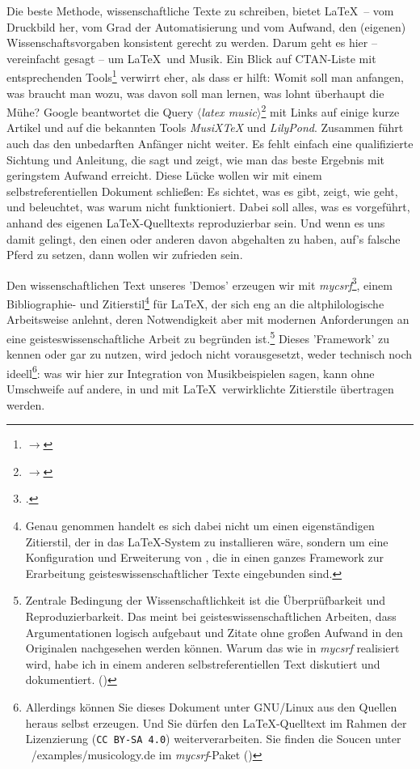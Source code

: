 Die beste Methode, wissenschaftliche Texte zu schreiben, bietet \LaTeX\ -- vom
Druckbild her, vom Grad der Automatisierung und vom Aufwand, den (ei\-ge\-nen)
Wissenschaftsvorgaben konsistent gerecht zu werden. Darum geht es hier --
vereinfacht gesagt -- um \LaTeX\ und Musik. Ein Blick auf CTAN-Liste mit
entsprechenden Tools\footnote{$\rightarrow$
} verwirrt eher, als dass er
hilft: Womit soll man anfangen, was braucht man wozu, was davon soll man lernen,
was lohnt überhaupt die Mühe? Google beantwortet die Query
$\langle$\textit{latex music}$\rangle$\footnote{$\rightarrow$
} mit Links auf einige kurze
Artikel und auf die bekannten Tools \textit{MusiX\TeX} und \textit{LilyPond}.
Zusammen führt auch das den unbedarften Anfänger nicht weiter. Es fehlt einfach
eine qualifizierte Sichtung und Anleitung, die sagt und zeigt, wie man das beste
Ergebnis mit geringstem Aufwand erreicht. Diese Lücke wollen wir mit einem
selbstreferentiellen Dokument schließen: Es sichtet, was es gibt, zeigt, wie
geht, und beleuchtet, was warum nicht funktioniert. Dabei soll alles, was es
vorgeführt, anhand des eigenen \LaTeX-Quelltexts reproduzierbar sein. Und wenn
es uns damit gelingt, den einen oder anderen davon abgehalten zu haben, auf's
falsche Pferd zu setzen, dann wollen wir zufrieden sein.

Den wissenschaftlichen Text unseres 'Demos' erzeugen wir mit
\textit{mycsrf}\footcite[vgl.][\nopage wp]{Reincke2018a}, einem Bibliographie-
und Zitierstil\footnote{Genau genommen handelt es sich dabei nicht um einen
eigenständigen Zitierstil, der in das \LaTeX-System zu installieren wäre,
sondern um eine Konfiguration und Erweiterung von , die in einen
ganzes Framework zur Erarbeitung geisteswissenschaftlicher Texte eingebunden
sind.} für \LaTeX, der sich eng an die altphilologische Arbeitsweise anlehnt,
deren Notwendigkeit aber mit modernen Anforderungen an eine
geisteswissenschaftliche Arbeit zu begründen ist.\footnote{Zentrale Bedingung
der Wissenschaftlichkeit ist die Überprüfbarkeit und Reproduzierbarkeit. Das
meint bei geisteswissenschaftlichen Arbeiten, dass Argumentationen logisch
aufgebaut und Zitate ohne großen Aufwand in den Originalen nachgesehen werden
können. Warum das wie in \textit{mycsrf} realisiert wird, habe ich in einem
anderen selbstreferentiellen Text diskutiert und dokumentiert. (\cite[Vgl.
dazu][1ff]{Reincke2018b})} Dieses 'Framework' zu kennen oder gar zu nutzen, wird
jedoch nicht vorausgesetzt, weder technisch noch ideell\footnote{Allerdings
können Sie dieses Dokument unter GNU/Linux aus den Quellen heraus selbst
erzeugen. Und Sie dürfen den \LaTeX-Quelltext im Rahmen der Lizenzierung
(\texttt{CC BY-SA 4.0}) weiterverarbeiten. Sie finden die Soucen unter
~/examples/musicology.de im \textit{mycsrf}-Paket (\cite[Vgl. dazu][\nopage
wp]{Reincke2019a})}: was wir hier zur Integration von Musikbeispielen sagen,
kann ohne Umschweife auf andere, in und mit \LaTeX\ verwirklichte Zitierstile
übertragen werden.

